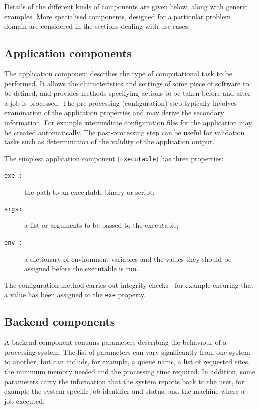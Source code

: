\documentclass{elsart}
\newcommand{\code}[1]{\texttt{#1}}
\begin{document}
Details of the different kinds of components are given below, along with
generic examples. More specialised components, designed for a particular
problem domain are considered in the sections dealing with use cases.

\subsection{Application components}

The application component describes the type of computational task to be
performed.  It allows the characteristics and settings of some
piece of software to be defined, and provides methods specifying
actions to be taken before and after a job is processed.  The
pre-processing (configuration) step typically involves examination of
the application properties and may derive the secondary
information. For example intermediate configuration files for the
application may be created automatically. The post-processing step can
be useful for validation tasks such as determination of the validity
of the application output.

The simplest application component (\texttt{Executable}) has three properties:
\begin{description}
\item[\code{exe :}] the path to an executable binary or script;
\item[\code{args:}] a list or arguments to be passed to the executable;
\item[\code{env :}] a dictionary of environment variables and the values they
  should be assigned before the executable is run.
\end{description}
The configuration method carries out integrity checks - for example
ensuring that a value has been assigned to the \code{exe} property.

\subsection{Backend components}
A backend component contains parameters describing the
behaviour of a processing system. The list of
parameters can vary significantly from one system to another, but can include,
for example, a queue name, a list of requested sites, the minimum memory
needed and the processing time required. In addition, some parameters carry the
information that the system reports back to the user, for example the 
system-specific job identifier and status, and the machine where a
job executed.
\end{document}
